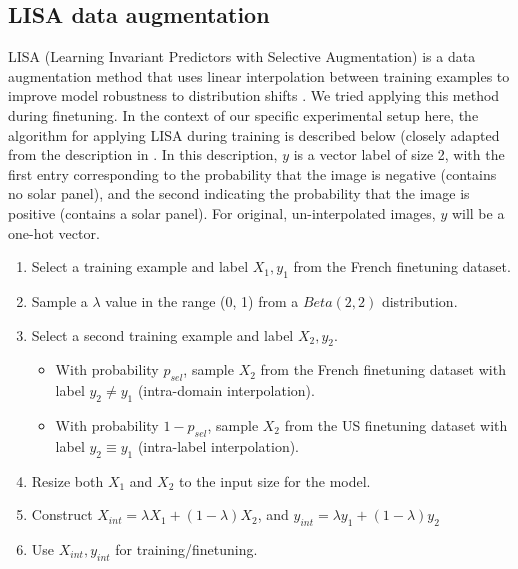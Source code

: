 \documentclass[10pt,twocolumn,letterpaper]{article}
\begin{document}
\subsection{LISA data augmentation}
LISA (Learning Invariant Predictors with Selective Augmentation) is a data augmentation method that uses linear interpolation between training examples to improve model robustness to distribution shifts \cite{yao2022improving}. We tried applying this method during finetuning. In the context of our specific experimental setup here, the algorithm for applying LISA during training is described below (closely adapted from the description in \cite{yao2022improving}. In this description, $y$ is a vector label of size 2, with the first entry corresponding to the probability that the image is negative (contains no solar panel), and the second indicating the probability that the image is positive (contains a solar panel). For original, un-interpolated images, $y$ will be a one-hot vector. 

\begin{enumerate}
\item Select a training example and label $X_1 , y_1$ from the French finetuning dataset.
\item Sample a $\lambda$ value in the range (0, 1) from a $Beta(2,2)$ distribution.
\item Select a second training example and label $X_2, y_2$.
\begin{itemize}[leftmargin=0.3cm]
\item With probability $p_{sel}$, sample $X_2$ from the French finetuning dataset with label $y_2 \neq y_1$ (intra-domain interpolation).
\item With probability $1 - p_{sel}$, sample $X_2$ from the US finetuning dataset with label $y_2 \equiv y_1$ (intra-label interpolation).
\end{itemize}
\item Resize both $X_1$ and $X_2$ to the input size for the model. 
\item Construct $X_{int} = \lambda X_1 + (1 - \lambda)X_2$, and  $y_{int} = \lambda y_1 + (1 - \lambda)y_2$
\item Use $X_{int}, y_{int}$ for training/finetuning.
\end{enumerate}
\end{document}
